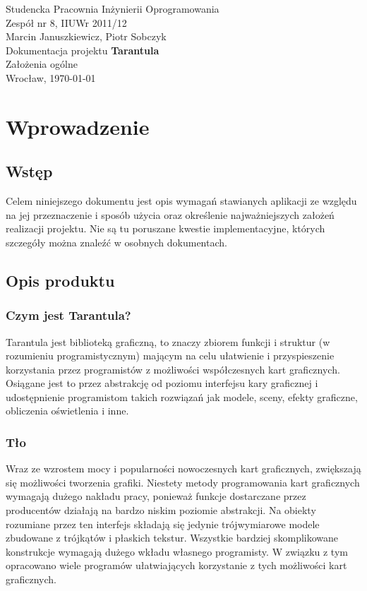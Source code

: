 \documentclass[11pt,leqno]{article}
\begin{document}
\begin{center}
\thispagestyle{empty}
{\Large Studencka Pracownia Inżynierii Oprogramowania}\\[0.5cm]
{\Large Zespół nr 8, IIUWr 2011/12}\\[2.5cm]

{\large Marcin Januszkiewicz, Piotr Sobczyk}\\[0.5cm]
{\huge Dokumentacja projektu \textbf{Tarantula}}\\[0.5cm]
{\huge Założenia ogólne}\\[0.5cm]
\vfill
{\large Wrocław, \today}
\end{center}
\newpage
\tableofcontents

\newpage


\newpage
\section{Wprowadzenie}

\subsection{Wstęp}
\noindent
Celem niniejszego dokumentu jest opis wymagań stawianych aplikacji ze względu na jej przeznaczenie i 
sposób użycia oraz określenie najważniejszych założeń realizacji projektu. 
Nie są tu poruszane kwestie implementacyjne, których szczegóły można znaleźć w osobnych dokumentach.

\subsection{Opis produktu}

\subsubsection{Czym jest Tarantula?}
\noindent
Tarantula jest biblioteką graficzną, to znaczy zbiorem funkcji i struktur (w rozumieniu programistycznym) mającym 
na celu ułatwienie i przyspieszenie korzystania przez programistów z możliwości współczesnych kart graficznych. Osiągane jest to przez abstrakcję od poziomu interfejsu kary graficznej i udostępnienie programistom takich rozwiązań jak modele, sceny, efekty graficzne, obliczenia oświetlenia i inne.

\subsubsection{Tło}
\noindent
Wraz ze wzrostem mocy i popularności nowoczesnych kart graficznych, zwiększają się możliwości tworzenia grafiki. 
Niestety metody programowania kart graficznych wymagają dużego nakładu pracy, ponieważ funkcje dostarczane przez producentów 
działają na bardzo niskim poziomie abstrakcji. Na obiekty rozumiane przez ten interfejs składają się jedynie trójwymiarowe modele zbudowane z trójkątów i płaskich tekstur. 
Wszystkie bardziej skomplikowane konstrukcje wymagają dużego wkładu własnego programisty. W związku z tym opracowano wiele programów 
ułatwiających korzystanie z tych możliwości kart graficznych. 
\end{document}
